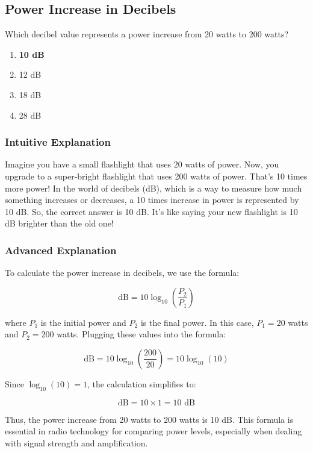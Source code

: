 \subsection{Power Increase in Decibels}
\label{T5B11}

\begin{tcolorbox}[colback=gray!10!white,colframe=black!75!black,title=T5B11]
Which decibel value represents a power increase from 20 watts to 200 watts?
\begin{enumerate}[label=\Alph*)]
    \item \textbf{10 dB}
    \item 12 dB
    \item 18 dB
    \item 28 dB
\end{enumerate}
\end{tcolorbox}

\subsubsection{Intuitive Explanation}
Imagine you have a small flashlight that uses 20 watts of power. Now, you upgrade to a super-bright flashlight that uses 200 watts of power. That's 10 times more power! In the world of decibels (dB), which is a way to measure how much something increases or decreases, a 10 times increase in power is represented by 10 dB. So, the correct answer is 10 dB. It's like saying your new flashlight is 10 dB brighter than the old one!

\subsubsection{Advanced Explanation}
To calculate the power increase in decibels, we use the formula:

\[
\text{dB} = 10 \log_{10}\left(\frac{P_2}{P_1}\right)
\]

where \(P_1\) is the initial power and \(P_2\) is the final power. In this case, \(P_1 = 20\) watts and \(P_2 = 200\) watts. Plugging these values into the formula:

\[
\text{dB} = 10 \log_{10}\left(\frac{200}{20}\right) = 10 \log_{10}(10)
\]

Since \(\log_{10}(10) = 1\), the calculation simplifies to:

\[
\text{dB} = 10 \times 1 = 10 \text{ dB}
\]

Thus, the power increase from 20 watts to 200 watts is 10 dB. This formula is essential in radio technology for comparing power levels, especially when dealing with signal strength and amplification.

